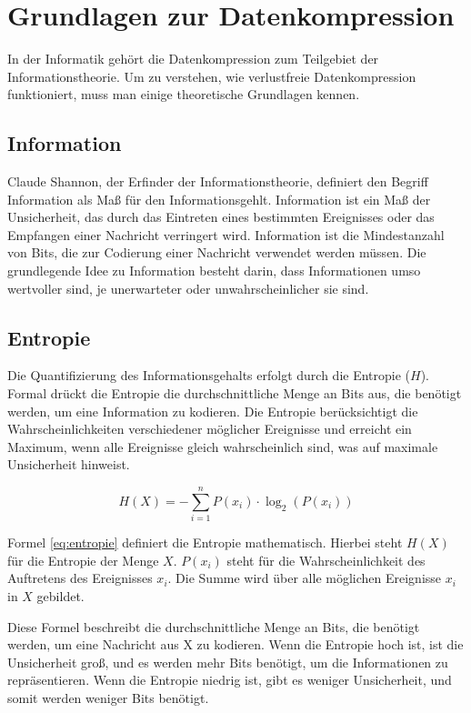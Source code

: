 \documentclass[conference]{IEEEtran}
\begin{document}
\section{Grundlagen zur Datenkompression}

In der Informatik gehört die Datenkompression zum Teilgebiet der Informationstheorie.
Um zu verstehen, wie verlustfreie Datenkompression funktioniert, muss man einige theoretische
Grundlagen kennen.

\subsection{Information}

Claude Shannon, der Erfinder der Informationstheorie, definiert den Begriff Information
als Maß für den Informationsgehlt.
Information ist ein Maß der Unsicherheit, das durch das Eintreten eines bestimmten
Ereignisses oder das Empfangen einer Nachricht verringert wird. \cite{shannon}
Information ist die Mindestanzahl von Bits, die zur Codierung einer Nachricht verwendet
werden müssen. \cite{shannon2}
Die grundlegende Idee zu Information besteht darin, dass Informationen umso wertvoller sind,
je unerwarteter oder unwahrscheinlicher sie sind.

\subsection{Entropie}

Die Quantifizierung des Informationsgehalts erfolgt durch die Entropie ($H$).
Formal drückt die Entropie die durchschnittliche Menge an Bits aus,
die benötigt werden, um eine Information zu kodieren. \cite{shannon}
Die Entropie berücksichtigt die Wahrscheinlichkeiten verschiedener möglicher
Ereignisse und erreicht ein Maximum, wenn alle Ereignisse gleich wahrscheinlich sind,
was auf maximale Unsicherheit hinweist.

\begin{equation}
  \label{eq:entropie}
  H(X) = -\sum_{i=1}^{n} P(x_i) \cdot \log_{2}(P(x_i))
\end{equation}

Formel \ref{eq:entropie} definiert die Entropie mathematisch.
Hierbei steht $H(X)$ für die Entropie der Menge $X$.
$P(x_i)$ steht für die Wahrscheinlichkeit des
Auftretens des Ereignisses $x_i$.
Die Summe wird über alle möglichen Ereignisse
$x_i$ in $X$ gebildet.

Diese Formel beschreibt die durchschnittliche Menge an Bits, die benötigt werden,
um eine Nachricht aus X zu kodieren.
Wenn die Entropie hoch ist, ist die Unsicherheit groß, und es werden mehr Bits
benötigt, um die Informationen zu repräsentieren.
Wenn die Entropie niedrig ist, gibt es weniger Unsicherheit, und somit werden
weniger Bits benötigt.
\end{document}
